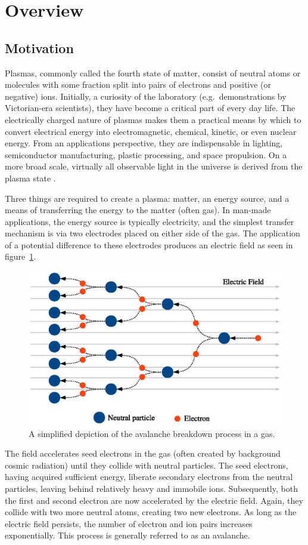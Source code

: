 \section{Overview}

\subsection{Motivation}
Plasmas, commonly called the fourth state of matter, consist of neutral atoms or
molecules with some fraction split into pairs of electrons and positive (or
negative) ions. Initially, a curiosity of the laboratory (e.g.\ demonstrations
by Victorian-era scientists), they have become a critical part of every day
life. The electrically charged nature of plasmas makes them a practical means by
which to convert electrical energy into electromagnetic, chemical, kinetic, or
even nuclear energy. From an applications perspective, they are indispensable in
lighting, semiconductor manufacturing, plastic processing, and space propulsion.
On a more broad scale, virtually all observable light in the universe is derived
from the plasma state \cite{NA2007}.

Three things are required to create a plasma: matter, an energy source, and a
means of transferring the energy to the matter (often gas). In man-made
applications, the energy source is typically electricity, and the simplest
transfer mechanism is via two electrodes placed on either side of the gas. The
application of a potential difference to these electrodes produces an electric
field as seen in figure~\ref{fig:avalanche}.
\begin{figure}
  \centering
  \includegraphics{./chapters/introduction/figures/avalanche.eps}
  \caption{A simplified depiction of the avalanche breakdown process in a gas.}
  \label{fig:avalanche}
\end{figure}
The field accelerates seed electrons in the gas (often created by background
cosmic radiation) until they collide with neutral particles. The seed electrons,
having acquired sufficient energy, liberate secondary electrons from the neutral
particles, leaving behind relatively heavy and immobile ions. Subsequently, both
the first and second electron are now accelerated by the electric field. Again,
they collide with two more neutral atoms, creating two new electrons. As long as
the electric field persists, the number of electron and ion pairs increases
exponentially. This process is generally referred to as an avalanche.

